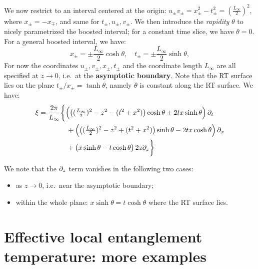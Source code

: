 \documentclass[11pt,a4paper]{article}
\begin{document}
\pagebreak[4]
	
	We now restrict to an interval centered at the origin: $
		u_\pm v_\pm
		= x^2_\pm - t^2_\pm
		= (\frac{L_\infty}{2})^2
	$, where $x_\pm = -x_\mp$, and same for $t_\pm, u_\pm, v_\pm$. 
	We then introduce the \textit{rapidity} $\theta$ to nicely parametrized the boosted interval; for a constant time slice, we have $\theta = 0$. For a general boosted interval, we have:
	\begin{equation}
		x_\pm = \pm \frac{L_\infty}{2} \cosh \theta,
	\quad
		t_\pm = \pm \frac{L_\infty}{2} \sinh \theta,
	\end{equation}
	For now the coordinates $u_\pm, v_\pm, x_\pm, t_\pm$ and the coordinate length $L_\infty$ are all specified at $z\to 0$, i.e.~at the \textbf{asymptotic boundary}. Note that the RT surface lies on the plane $
		t_\pm / x_\pm = \tanh \theta
	$, namely $\theta$ is constant along the RT surface. 
	We have:
	\begin{gather}
	\begin{aligned}
		\xi &= \frac{2\pi}{L_\infty} \bigg\{
			\pqty\Big{
				\pqty{
					(\tfrac{L_\infty}{2})^2 - z^2
					- (t^2 + x^2)
				} \cosh\theta
				+ 2tx \sinh\theta
			} \,\pdd{t}
		\\ &\qquad\qquad 
			+ \pqty\Big{
				\pqty{
					(\tfrac{L_\infty}{2})^2 - z^2
					+ (t^2 + x^2)
				} \sinh\theta
				- 2tx \cosh\theta
			} \,\pdd{x}
		\\ &\qquad\qquad 
			+ \pqty\big{
				x\sinh\theta
				- t\cosh\theta
			} \,2z\pdd{z}
		\bigg\}
	\end{aligned}
	\end{gather}
	
	We note that the $\partial_{z}$ term vanishes in the following two cases:
	\begin{itemize}[noitemsep,topsep=0pt]
	\item as $z\to 0$, i.e.~near the asymptotic boundary;
	\item within the whole plane: $
			x\sinh\theta
			= t\cosh\theta
		$ where the RT surface lies. 
	\end{itemize}

\section{Effective local entanglement temperature: more examples}
	
\end{document}
